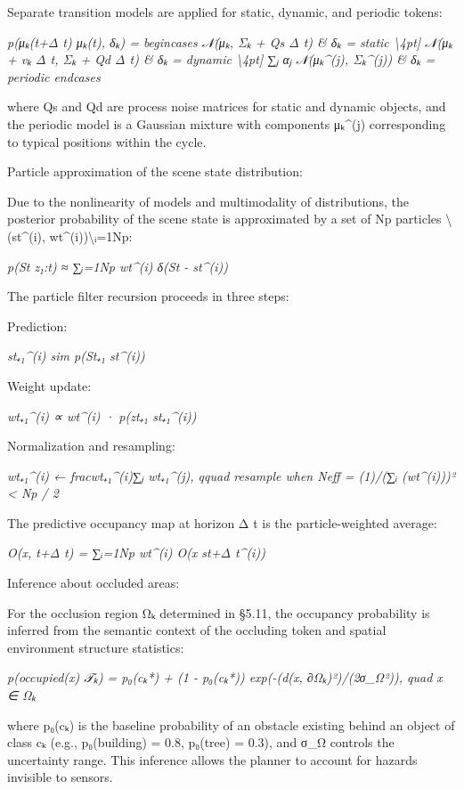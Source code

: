 \documentclass[
]{article}
\begin{document}
Separate transition models are applied for static, dynamic, and periodic
tokens:

\emph{p(μₖ(t+Δ t) \textbar{} μₖ(t), δₖ) = begincases 𝒩(μₖ, Σₖ + Qs Δ t)
\& δₖ = static \textbackslash4pt{]} 𝒩(μₖ + vₖ Δ t, Σₖ + Qd Δ t) \& δₖ =
dynamic \textbackslash4pt{]} ∑ⱼ αⱼ 𝒩(μₖ\^{}(j), Σₖ\^{}(j)) \& δₖ =
periodic endcases}

where Qs and Qd are process noise matrices for static and dynamic
objects, and the periodic model is a Gaussian mixture with components
μₖ\^{}(j) corresponding to typical positions within the cycle.

Particle approximation of the scene state distribution:

Due to the nonlinearity of models and multimodality of distributions,
the posterior probability of the scene state is approximated by a set of
Np particles \textbackslash(st\^{}(i), wt\^{}(i))\textbackslash ᵢ=1Np:

\emph{p(St \textbar{} z₁:t) ≈ ∑ᵢ=1Np wt\^{}(i) δ(St - st\^{}(i))}

The particle filter recursion proceeds in three steps:

Prediction:

\emph{st₊₁\^{}(i) sim p(St₊₁ \textbar{} st\^{}(i))}

Weight update:

\emph{wt₊₁\^{}(i) ∝ wt\^{}(i) · p(zt₊₁ \textbar{} st₊₁\^{}(i))}

Normalization and resampling:

\emph{wt₊₁\^{}(i) ← fracwt₊₁\^{}(i)∑ⱼ wt₊₁\^{}(j), qquad resample when
Neff = (1)/(∑ᵢ (wt\^{}(i)))² \textless{} Np / 2}

The predictive occupancy map at horizon Δ t is the particle-weighted
average:

\emph{O(x, t+Δ t) = ∑ᵢ=1Np wt\^{}(i) O(x \textbar{} st+Δ t\^{}(i))}

Inference about occluded areas:

For the occlusion region Ωₖ determined in §5.11, the occupancy
probability is inferred from the semantic context of the occluding token
and spatial environment structure statistics:

\emph{p(occupied(x) \textbar{} 𝒯ₖ) = p₀(cₖ*) + (1 - p₀(cₖ*)) exp(-(d(x,
∂Ωₖ)²)/(2σ\_Ω²)), quad x ∈ Ωₖ}

where p₀(cₖ) is the baseline probability of an obstacle existing behind
an object of class cₖ (e.g., p₀(building) = 0.8, p₀(tree) = 0.3), and
σ\_Ω controls the uncertainty range. This inference allows the planner
to account for hazards invisible to sensors.
\end{document}
